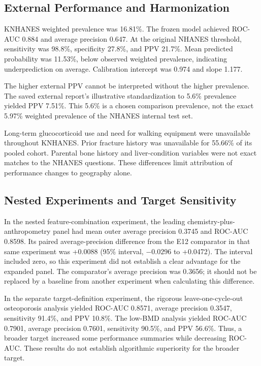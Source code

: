 \documentclass[11pt,a4paper]{article}
\begin{document}
\subsection{External Performance and Harmonization}
KNHANES weighted prevalence was 16.81\%. The frozen model achieved ROC-AUC 0.884 and average precision 0.647. At the original NHANES threshold, sensitivity was 98.8\%, specificity 27.8\%, and PPV 21.7\%. Mean predicted probability was 11.53\%, below observed weighted prevalence, indicating underprediction on average. Calibration intercept was 0.974 and slope 1.177.

The higher external PPV cannot be interpreted without the higher prevalence. The saved external report's illustrative standardization to 5.6\% prevalence yielded PPV 7.51\%. This 5.6\% is a chosen comparison prevalence, not the exact 5.97\% weighted prevalence of the NHANES internal test set.

Long-term glucocorticoid use and need for walking equipment were unavailable throughout KNHANES. Prior fracture history was unavailable for 55.66\% of its pooled cohort. Parental bone history and liver-condition variables were not exact matches to the NHANES questions. These differences limit attribution of performance changes to geography alone.

\subsection{Nested Experiments and Target Sensitivity}
In the nested feature-combination experiment, the leading chemistry-plus-anthropometry panel had mean outer average precision 0.3745 and ROC-AUC 0.8598. Its paired average-precision difference from the E12 comparator in that same experiment was +0.0088 (95\% interval, $-0.0296$ to +0.0472). The interval included zero, so this experiment did not establish a clear advantage for the expanded panel. The comparator's average precision was 0.3656; it should not be replaced by a baseline from another experiment when calculating this difference.

In the separate target-definition experiment, the rigorous leave-one-cycle-out osteoporosis analysis yielded ROC-AUC 0.8571, average precision 0.3547, sensitivity 91.4\%, and PPV 10.8\%. The low-BMD analysis yielded ROC-AUC 0.7901, average precision 0.7601, sensitivity 90.5\%, and PPV 56.6\%. Thus, a broader target increased some performance summaries while decreasing ROC-AUC. These results do not establish algorithmic superiority for the broader target.
\end{document}
